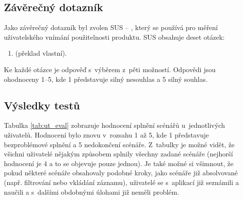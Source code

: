 \documentclass[thesis=M,czech]{FITthesis}[2012/06/26]
\begin{document}
\subsection{Závěrečný dotazník}
Jako závěrečný dotazník byl zvolen SUS -- , který se používá pro měření uživatelského vnímání použitelnosti produktu. SUS obsahuje deset otázek:
\begin{enumerate}
 \item {} (překlad vlastní).
\end{enumerate}
Ke každé otázce je odpověď s~výběrem z~pěti možností. Odpovědi jsou ohodnoceny 1--5, kde 1 představuje silný nesouhlas a 5 silný souhlas. \cite{sus}

\subsection{Výsledky testů}
Tabulka \ref{tab:ut_eval} zobrazuje hodnocení splnění scénářů u~jednotlivých uživatelů. Hodnocení bylo znovu v~rozsahu 1 až 5, kde 1 představuje bezproblémové splnění a 5 nedokončení scénáře.  Z~tabulky je možné vidět, že všichni uživatelé nějakým způsobem splnily všechny zadané scénáře (nejhorší hodnocení je 4 a to se objevuje pouze jednou). Je také možné si všimnout, že pokud některé scénáře obsahovaly podobné kroky, jako scénáře již absolvované (např. filtrování nebo vkládání záznamu), uživatelé se s~aplikací již seznámili a naučili a s~dalšími obdobnými úlohami již neměli problém.
\end{document}
